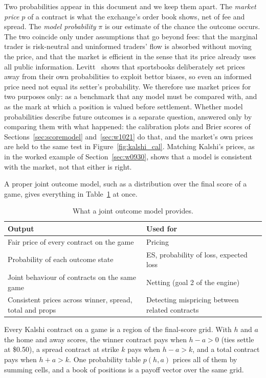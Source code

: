 \documentclass[11pt]{article}
\begin{document}
Two probabilities appear in this document and we keep them apart. The \emph{market price} $p$ of a contract is what the exchange's order book shows, net of fee and spread. The \emph{model probability} $\pi$ is our estimate of the chance the outcome occurs. The two coincide only under assumptions that go beyond fees: that the marginal trader is risk-neutral and uninformed traders' flow is absorbed without moving the price, and that the market is efficient in the sense that its price already uses all public information. Levitt~\cite{levitt2004} shows that sportsbooks deliberately set prices away from their own probabilities to exploit bettor biases, so even an informed price need not equal its setter's probability. We therefore use market prices for two purposes only: as a benchmark that any model must be compared with, and as the mark at which a position is valued before settlement. Whether model probabilities describe future outcomes is a separate question, answered only by comparing them with what happened: the calibration plots and Brier scores of Sections~\ref{sec:scoremodel} and~\ref{sec:w1021} do that, and the market's own prices are held to the same test in Figure~\ref{fig:kalshi_cal}. Matching Kalshi's prices, as in the worked example of Section~\ref{sec:w0930}, shows that a model is consistent with the market, not that either is right.

A proper joint outcome model, such as a distribution over the final score of a game, gives everything in Table~\ref{tab:joint_uses} at once.

\begin{table}[H]
\centering
\small
\begin{tabular}{p{6.5cm}p{6.5cm}}
\toprule
\textbf{Output} & \textbf{Used for} \\
\midrule
Fair price of every contract on the game & Pricing \\
Probability of each outcome state & ES, probability of loss, expected loss \\
Joint behaviour of contracts on the same game & Netting (goal 2 of the engine) \\
Consistent prices across winner, spread, total and props & Detecting mispricing between related contracts \\
\bottomrule
\end{tabular}
\caption{What a joint outcome model provides.}
\label{tab:joint_uses}
\end{table}

Every Kalshi contract on a game is a region of the final-score grid. With $h$ and $a$ the home and away scores, the winner contract pays when $h-a>0$ (ties settle at \$0.50), a spread contract at strike $k$ pays when $h-a>k$, and a total contract pays when $h+a>k$. One probability table $p(h,a)$ prices all of them by summing cells, and a book of positions is a payoff vector over the same grid.
\end{document}

